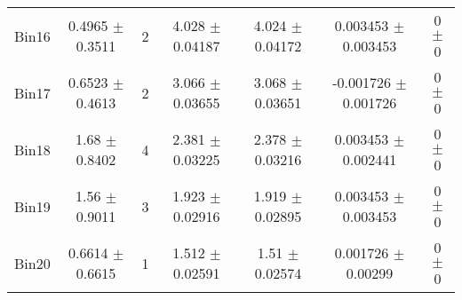 \begin{tabular}{@{\extracolsep{4pt}}lcccccc@{}}
     Bin16 & 0.4965 $\pm$ 0.3511 & 2 & 4.028 $\pm$ 0.04187 & 4.024 $\pm$ 0.04172 & 0.003453 $\pm$ 0.003453 & 0 $\pm$ 0 \\ 
     Bin17 & 0.6523 $\pm$ 0.4613 & 2 & 3.066 $\pm$ 0.03655 & 3.068 $\pm$ 0.03651 & -0.001726 $\pm$ 0.001726 & 0 $\pm$ 0 \\ 
     Bin18 & 1.68 $\pm$ 0.8402 & 4 & 2.381 $\pm$ 0.03225 & 2.378 $\pm$ 0.03216 & 0.003453 $\pm$ 0.002441 & 0 $\pm$ 0 \\ 
     Bin19 & 1.56 $\pm$ 0.9011 & 3 & 1.923 $\pm$ 0.02916 & 1.919 $\pm$ 0.02895 & 0.003453 $\pm$ 0.003453 & 0 $\pm$ 0 \\ 
     Bin20 & 0.6614 $\pm$ 0.6615 & 1 & 1.512 $\pm$ 0.02591 & 1.51 $\pm$ 0.02574 & 0.001726 $\pm$ 0.00299 & 0 $\pm$ 0 \\ 
\hline\hline
  \end{tabular}
